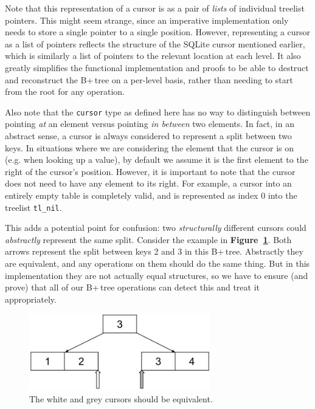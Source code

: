 \documentclass[12pt]{article}
\begin{document}
Note that this representation of a cursor is as a pair of \textit{lists} of individual treelist pointers. This might seem strange, since an imperative implementation only needs to store a single pointer to a single position. However, representing a cursor as a list of pointers reflects the structure of the SQLite cursor mentioned earlier, which is similarly a list of pointers to the relevant location at each level. It also greatly simplifies the functional implementation and proofs to be able to destruct and reconstruct the B+\,tree on a per-level basis, rather than needing to start from the root for any operation.

Also note that the \texttt{cursor} type as defined here has no way to distinguish between pointing \textit{at} an element versus pointing \textit{in between} two elements. In fact, in an abstract sense, a cursor is always considered to represent a split between two keys. In situations where we are considering the element that the cursor is on (e.g. when looking up a value), by default we assume it is the first element to the right of the cursor’s position. However, it is important to note that the cursor does not need to have any element to its right. For example, a cursor into an entirely empty table is completely valid, and is represented as index 0 into the treelist \texttt{tl\_nil}.

This adds a potential point for confusion: two \textit{structurally} different cursors could \textit{abstractly} represent the same split. Consider the example in \textbf{Figure~\ref{fig:equivcursor}}. Both arrows represent the split between keys 2 and 3 in this B+\,tree. Abstractly they are equivalent, and any operations on them should do the same thing. But in this implementation they are not actually equal structures, so we have to ensure (and prove) that all of our B+\,tree operations can detect this and treat it appropriately.

\begin{figure}
    \centering
    \includegraphics[width=0.7\textwidth]{equivcursor.jpg}
    \caption{The white and grey cursors should be equivalent.}
    \label{fig:equivcursor}
\end{figure}
\end{document}
